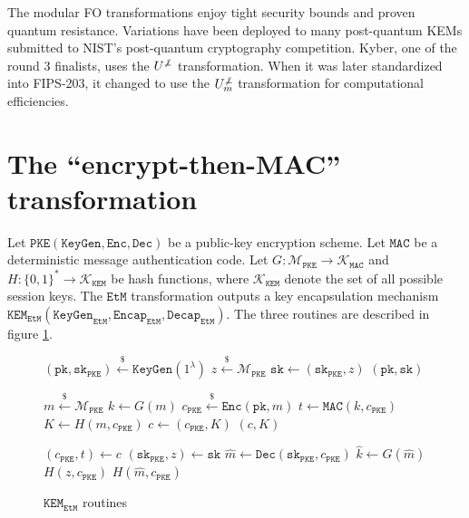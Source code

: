 \documentclass[floatrow,journal=tches,submission]{iacrtrans}
\newcommand{\pke}{\texttt{PKE}}
\newcommand{\keygen}{\texttt{KeyGen}}
\newcommand{\encrypt}{\texttt{Enc}}
\newcommand{\decrypt}{\texttt{Dec}}
\newcommand{\kem}{\texttt{KEM}}
\newcommand{\encap}{\texttt{Encap}}
\newcommand{\decap}{\texttt{Decap}}
\newcommand{\etm}{\texttt{EtM}}  %
\newcommand{\mac}{\texttt{MAC}}
\newcommand{\pk}{\texttt{pk}}
\newcommand{\sk}{\texttt{sk}}
\newcommand{\leftsample}{\stackrel{\$}{\leftarrow}}
\begin{document}
The modular FO transformations enjoy tight security bounds and proven quantum resistance. Variations have been deployed to many post-quantum KEMs submitted to NIST's post-quantum cryptography competition. Kyber, one of the round 3 finalists, uses the $U^{\not\bot}$ transformation. When it was later standardized into FIPS-203, it changed to use the $U^{\not\bot}_m$ transformation for computational efficiencies.

\section{The ``encrypt-then-MAC'' transformation}\label{sec:main-results}
Let $\pke(\keygen, \encrypt, \decrypt)$ be a public-key encryption scheme. Let $\mac$ be a deterministic message authentication code. Let $G: \mathcal{M}_\pke \rightarrow \mathcal{K}_\mac$ and $H: \{0,1\}^\ast \rightarrow \mathcal{K}_\kem$ be hash functions, where $\mathcal{K}_\kem$ denote the set of all possible session keys. The $\etm$ transformation outputs a key encapsulation mechanism $\kem_\etm(\keygen_\etm, \encap_\etm, \decap_\etm)$. The three routines are described in figure \ref{fig:etm-routines}.

\begin{figure}[H]
    \center
    \begin{algorithm}[H]
        \caption{$\keygen_\etm$}\label{alg:etm-keygen}
        \begin{algorithmic}[1]
            \State $(\pk, \sk_\pke) \leftsample \keygen(1^\lambda)$
            \State $z \leftsample \mathcal{M}_\pke$
            \State $\sk \leftarrow (\sk_\pke, z)$
            \State \Return $(\pk, \sk)$
        \end{algorithmic}
    \end{algorithm}
    \begin{algorithm}[H]
        \caption{$\encap_\etm(\pk)$}\label{alg:etm-encap}
        \begin{algorithmic}[1]
            \State $m \leftsample \mathcal{M}_\pke$
            \State $k \leftarrow G(m)$
            \State $c_\pke \leftsample \encrypt(\pk, m)$
            \State $t \leftarrow \mac(k, c_\pke)$
            \State $K \leftarrow H(m, c_\pke)$
            \State $c \leftarrow (c_\pke, K)$
            \State \Return $(c, K)$
        \end{algorithmic}
    \end{algorithm}
    \begin{algorithm}[H]
        \caption{$\decap_\etm(\sk, c)$}\label{alg:etm-decap}
        \begin{algorithmic}[1]
            \State $(c_\pke, t) \leftarrow c$
            \State $(\sk_\pke, z) \leftarrow \sk$
            \State $\hat{m} \leftarrow \decrypt(\sk_\pke, c_\pke)$
            \State $\hat{k} \leftarrow G(\hat{m})$
            \If{$\mac(\hat{k}, c_\pke) \neq t$}
                \State \Return $H(z, c_\pke)$
            \EndIf
            \State \Return $H(\hat{m}, c_\pke)$
        \end{algorithmic}
    \end{algorithm}
    \caption{$\kem_\etm$ routines}\label{fig:etm-routines} 
\end{figure}
\end{document}

